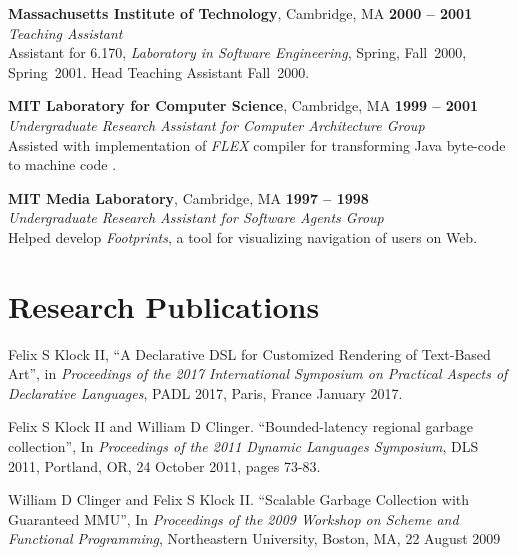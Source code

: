 \documentclass[margin,line,draft]{res}
\def\noneed#1{}
\def\coursetitle#1{\textsl{#1}}
\newcommand{\mysidestyle}{\sc}
\begin{document}
\begin{resume}
    \textbf{Massachusetts Institute of Technology}, Cambridge, MA \hfill \textbf{2000 -- 2001} \\\vspace{1mm}%
    \textsl{Teaching Assistant} \\
    Assistant for 6.170, \coursetitle{Laboratory in Software Engineering},
    Spring, Fall~2000, Spring~2001. {Head Teaching Assistant Fall~2000.}

    \textbf{MIT Laboratory for Computer Science}, Cambridge, MA  \hfill \textbf{1999 -- 2001}\\\vspace{1mm}%
    \textsl{Undergraduate Research Assistant for Computer Architecture Group}\\
    Assisted with implementation of \emph{FLEX} compiler {for transforming
    Java byte-code to machine code}
    .

    \textbf{MIT Media Laboratory}, Cambridge, MA \hfill \textbf{1997 -- 1998}\\\vspace{1mm}%
    \textsl{Undergraduate Research Assistant for Software Agents Group} \\
    Helped develop \emph{Footprints}, a tool for visualizing navigation of 
    users on Web.


    \section{\mysidestyle Research Publications}

    Felix S Klock II, ``A Declarative DSL for Customized Rendering of Text-Based Art'', in \textsl{Proceedings of the 2017 International Symposium on Practical Aspects of Declarative Languages}, PADL 2017, Paris, France January 2017.

    Felix S Klock II and William D Clinger.  ``Bounded-latency regional garbage collection'', In \textsl{Proceedings of the 2011 Dynamic Languages Symposium}, DLS 2011, Portland, OR, 24 October 2011, pages 73-83.

    William D Clinger and Felix S Klock II. ``Scalable Garbage Collection with Guaranteed MMU'', In \textsl{Proceedings of the 2009 Workshop on Scheme and Functional Programming}, Northeastern University, Boston, MA, 22 August 2009


\end{resume}
\end{document}
